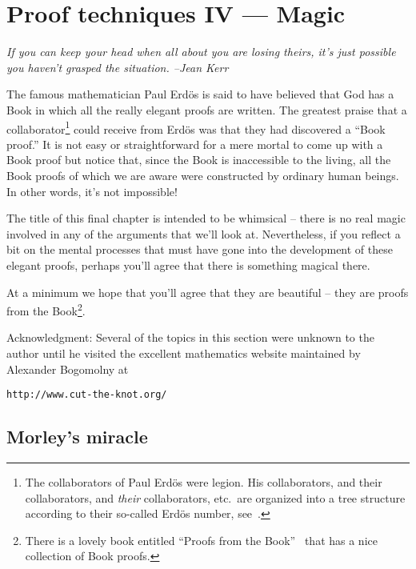
\chapter{Proof techniques IV --- Magic}
\label{ch:magic}

{\em If you can keep your head when all about you are losing theirs, it's 
just possible you haven't grasped the situation. --Jean Kerr} 

\vspace{.3in}

The famous mathematician 
 Paul Erd\"{o}s is said to have believed that
God has a Book in which all the really elegant proofs are written.
The greatest praise that a collaborator\footnote{The collaborators
of Paul Erd\"{o}s were legion.  His collaborators, and their collaborators,
and \emph{their} collaborators, etc.\ are organized into a tree structure 
according to their so-called Erd\"{o}s number,
see~\cite{wiki-Erdos_number}.} could receive from Erd\"{o}s
was that they had discovered a ``Book proof.''   It is not
easy or straightforward for a mere mortal to come up with a Book 
proof but notice that, since the Book is inaccessible to the living,
all the Book proofs of which we are aware were constructed by ordinary
human beings.  In other words, it's not impossible!

The title of this final chapter is intended to be whimsical -- there
is no real magic involved in any of the arguments that we'll look at.  
Nevertheless, if you  reflect a bit on the mental processes that 
must have gone into the development of these elegant proofs, perhaps
you'll agree that there is something magical there.   

At a minimum
we hope that you'll agree that they are beautiful -- they are proofs
from the Book\footnote{There is a lovely book entitled ``Proofs from the
Book''~\cite{pftB} that has a nice collection of Book proofs.}.

Acknowledgment: Several of the topics in this section were unknown to
the author until he visited the excellent mathematics website maintained
by Alexander Bogomolny at

\verb+http://www.cut-the-knot.org/+

\clearpage

\section{Morley's miracle}
\label{sec:morley}

